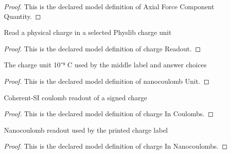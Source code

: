 \begin{proof}
  This is the declared model definition of Axial Force Component Quantity.
\end{proof}
\begin{definition}
  \label{def:physics:phyx-mini-0900:phyxminiproblems-problemphyxmini0900-chargereadout}
  Read a physical charge in a selected Physlib charge unit
\end{definition}
\begin{proof}
  This is the declared model definition of charge Readout.
\end{proof}
\begin{definition}
  \label{def:physics:phyx-mini-0900:phyxminiproblems-problemphyxmini0900-nanocoulombunit}
  The charge unit 10⁻⁹ C used by the middle label and answer choices
\end{definition}
\begin{proof}
  This is the declared model definition of nanocoulomb Unit.
\end{proof}
\begin{definition}
  \label{def:physics:phyx-mini-0900:phyxminiproblems-problemphyxmini0900-chargeincoulombs}
  Coherent-SI coulomb readout of a signed charge
\end{definition}
\begin{proof}
  This is the declared model definition of charge In Coulombs.
\end{proof}
\begin{definition}
  \label{def:physics:phyx-mini-0900:phyxminiproblems-problemphyxmini0900-chargeinnanocoulombs}
  Nanocoulomb readout used by the printed charge label
\end{definition}
\begin{proof}
  This is the declared model definition of charge In Nanocoulombs.
\end{proof}
